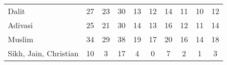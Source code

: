 \begin{tabular}{l*{9}{c}}
Dalit               &          27&          23&          30&          13&          12&          14&          11&          10&          12\\
Adivasi             &          25&          21&          30&          14&          13&          16&          12&          11&          14\\
Muslim              &          34&          29&          38&          19&          17&          20&          16&          14&          18\\
Sikh, Jain, Christian&          10&           3&          17&           4&           0&           7&           2&           1&           3\\
\bottomrule
\end{tabular}
